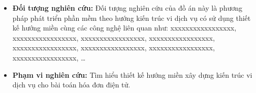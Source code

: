 \begin{itemize}

\item \textbf{Đối tượng nghiên cứu:} Đối tượng nghiên cứu của đồ án này là phương pháp phát triển phần mềm theo hướng kiến trúc vi dịch vụ có sử dụng thiết kế hướng miền cùng các công nghệ liên quan như: xxxxxxxxxxxxxxxxx, xxxxxxxxxxxxxxxxx, xxxxxxxxxxxxxxxxx, xxxxxxxxxxxxxxxxx, xxxxxxxxxxxxxxxxx, xxxxxxxxxxxxxxxxx, xxxxxxxxxxxxxxxxx, xxxxxxxxxxxxxxxxx,  \dots
  
\item \textbf{Phạm vi nghiên cứu:} Tìm hiểu thiết kế hướng miền xây dựng kiến trúc vi dịch vụ cho bài toán hóa đơn điện tử.

\end{itemize}